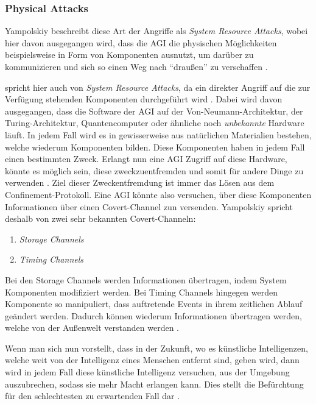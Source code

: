         \subsubsection{Physical Attacks}
        Yampolskiy beschreibt diese Art der Angriffe als \textit{System Resource Attacks}, wobei hier davon ausgegangen
        wird, dass die AGI die physischen Möglichkeiten beispielsweise in Form von Komponenten ausnutzt, um darüber zu
        kommunizieren und sich so einen Weg nach ``draußen'' zu verschaffen \cite{yampolskiy2012leakproofing}.

        \citeauthor*{yampolskiy2012leakproofing} spricht hier auch von \textit{System Resource Attacks}, da ein direkter
        Angriff auf die zur Verfügung stehenden Komponenten durchgeführt wird \citeyearpar{yampolskiy2012leakproofing}.
        Dabei wird davon ausgegangen, dass die Software der AGI auf der Von-Neumann-Architektur, der Turing-Architektur,
        Quantencomputer oder ähnliche noch \textit{unbekannte} Hardware läuft. In jedem Fall wird es in gewisserweise aus
        natürlichen Materialien bestehen, welche wiederum Komponenten bilden. Diese Komponenten haben in jedem Fall einen
        bestimmten Zweck. Erlangt nun eine AGI Zugriff auf diese Hardware, könnte es möglich sein, diese zweckzuentfremden
        und somit für andere Dinge zu verwenden \cite[s. 199]{yampolskiy2012leakproofing}. Ziel dieser Zweckentfremdung
        ist immer das Lösen aus dem Confinement-Protokoll. Eine AGI könnte also versuchen, über diese Komponenten
        Informationen über einen Covert-Channel zun versenden. Yampolskiy spricht deshalb von zwei sehr bekannten
        Covert-Channeln:

        \begin{enumerate}
            \item \textit{Storage Channels}
            \item \textit{Timing Channels}
        \end{enumerate}

        Bei den Storage Channels werden Informationen übertragen, indem System Komponenten modifiziert werden. Bei Timing
        Channels hingegen werden Komponente so manipuliert, dass auftretende Events in ihrem zeitlichen Ablauf geändert
        werden. Dadurch können wiederum Informationen übertragen werden, welche von der Außenwelt verstanden werden
        \cite[s. 200]{yampolskiy2012leakproofing}.

        Wenn man sich nun vorstellt, dass in der Zukunft, wo es künstliche Intelligenzen, welche weit von
        der Intelligenz eines Menschen entfernt sind, geben wird, dann wird in jedem Fall diese künstliche Intelligenz
        versuchen, aus der Umgebung auszubrechen, sodass sie mehr Macht erlangen kann. Dies stellt die Befürchtung für
        den schlechtesten zu erwartenden Fall dar \cite{yampolskiy2012leakproofing}.

